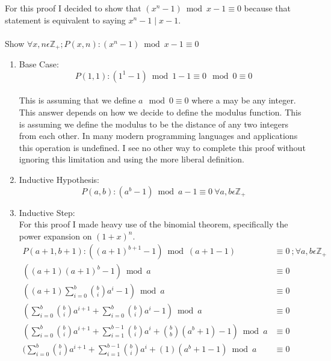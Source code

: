 \documentclass[12pt]{article}
\begin{document}
\noindent For this proof I decided to show that \begin{math}(x^n - 1)\bmod{x - 1}\equiv 0\end{math} because that statement is equivalent to saying \begin{math}x^n - 1\mid x - 1\end{math}.\\\\
\noindent Show \begin{math}\forall x,n \epsilon \mathbb{Z}_+ ;P(x,n):(x^n - 1)\bmod{x - 1}\equiv 0\end{math} 
\begin{enumerate}
\item Base Case:\\
\[P(1,1):(1^1 - 1)\bmod{1 - 1}\equiv 0 \mod 0 \equiv 0\]\\
This is assuming that we define \begin{math}a \mod 0 \equiv 0\end{math} where a may be any integer. This answer depends on how we decide to define the modulus function. This is assuming we define the modulus to be the distance of any two integers from each other. In many modern programming languages and applications this operation is undefined. I see no other way to complete this proof without ignoring this limitation and using the more liberal definition.
\item Inductive Hypothesis:
\[P(a,b):(a^b - 1)\bmod{a - 1}\equiv 0\ \forall a,b \epsilon \mathbb{Z}_+\]
\item Inductive Step:\\
For this proof I made heavy use of the binomial theorem, specifically the power expansion on \begin{math}(1+x)^n\end{math}.
\begin{align*}
P(a+1,b+1):((a+1)^{b+1} - 1)\bmod{(a + 1 - 1)}&\equiv 0\ ; \forall a,b \epsilon \mathbb{Z}_+\\
((a+1)(a+1)^b - 1)\bmod{a}&\equiv 0\\
((a+1)\sum\limits_{i = 0}^{b} {b \choose i} a^i - 1)\bmod{a}&\equiv 0\\
(\sum\limits_{i = 0}^{b} {b \choose i} a^{i+1} + \sum\limits_{i = 0}^{b} {b \choose i} a^i - 1)\bmod{a}&\equiv 0\\
(\sum\limits_{i = 0}^{b} {b \choose i} a^{i+1} + \sum\limits_{i = 1}^{b - 1} {b \choose i} a^i + {b \choose b}(a^b + 1) - 1)\bmod{a}&\equiv 0\\
(\sum\limits_{i = 0}^{b} {b \choose i} a^{i+1} + \sum\limits_{i = 1}^{b - 1} {b \choose i} a^i + (1)(a^b + 1 - 1)\bmod{a}&\equiv 0\\

\end{align*}
\end{enumerate}
\end{document}
